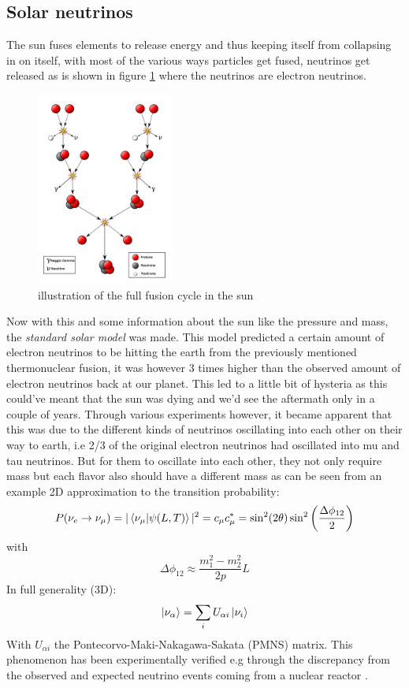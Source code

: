 \subsection{Solar neutrinos}
The sun fuses elements to release energy and thus keeping itself from collapsing in 
on itself, with most of the various ways particles get fused, neutrinos get released as 
is shown in figure \ref{fig:SunFusion}\cite{FusionIllu} where the neutrinos are electron neutrinos.
\begin{figure}
	\centering
	\includegraphics[width=0.4\textwidth]{figures/SunFusion.png}
	\caption{illustration of the full fusion cycle in the sun}
	\label{fig:SunFusion}
\end{figure}
Now with this and some information about the sun like the pressure and mass,
the \textit{standard solar model} was made. This model predicted a certain
amount of electron neutrinos to be hitting the earth from the previously mentioned
thermonuclear fusion, it was however 3 times higher than the observed amount of
electron neutrinos back at our planet. This led to a little bit of hysteria as this could've meant
that the sun was dying and we'd see the aftermath only in a couple of years.
Through various experiments however, it became apparent that this was due to
the different kinds of neutrinos oscillating into each other on their way to
earth, i.e 2/3 of the original electron neutrinos had oscillated into mu and
tau neutrinos. But for them to oscillate into each other, they not
only require mass but each flavor also should have a different mass as can be seen
from an example 2D approximation to the transition probability\cite{Bellini_2014}:
\begin{equation}
	P(\nu_e\rightarrow\nu_\mu) = |\braket{\nu_\mu|\psi(L,T)}|^2 = c_\mu c_\mu^* = \sin ^2(2 \theta) \sin ^2\left(\frac{\Delta \phi_{12}}{2}\right)
\end{equation}
with
\begin{equation}
	\Delta \phi_{12} \approx \frac{m_1^2 - m_2^2}{2p}L
\end{equation}
In full generality (3D):
\begin{equation}
	\ket{\nu_\alpha} = \sum_iU_{\alpha i} \ket{\nu_i}
\end{equation}
With $U_{\alpha i}$ the Pontecorvo-Maki-Nakagawa-Sakata (PMNS) matrix.  This
phenomenon has been experimentally verified e.g through the discrepancy from
the observed and expected neutrino events coming from a nuclear reactor \cite{Eguchi_2003}.
